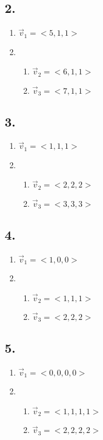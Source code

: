 \documentclass{article}
\begin{document}
\subsection{2.}
\begin{enumerate}[label=\textbf{\alph*.}]
	\item $ \vec{v}_1 = <5, 1, 1> $
	\item
		\begin{enumerate}[label=\textbf{\arabic*.}]
			\item $ \vec{v}_2 = <6, 1, 1> $
			\item $ \vec{v}_3 = <7, 1, 1> $
		\end{enumerate}
\end{enumerate}

\subsection{3.}
\begin{enumerate}[label=\textbf{\alph*.}]
	\item $ \vec{v}_1 = <1, 1, 1> $
	\item
		\begin{enumerate}[label=\textbf{\arabic*.}]
			\item $ \vec{v}_2 = <2, 2, 2> $
			\item $ \vec{v}_3 = <3, 3, 3> $
		\end{enumerate}
\end{enumerate}

\subsection{4.}
\begin{enumerate}[label=\textbf{\alph*.}]
	\item $ \vec{v}_1 = <1, 0, 0> $
	\item
		\begin{enumerate}[label=\textbf{\arabic*.}]
			\item $ \vec{v}_2 = <1, 1, 1> $
			\item $ \vec{v}_3 = <2, 2, 2> $
		\end{enumerate}
\end{enumerate}

\subsection{5.}
\begin{enumerate}[label=\textbf{\alph*.}]
	\item $ \vec{v}_1 = <0, 0, 0, 0> $
	\item
		\begin{enumerate}[label=\textbf{\arabic*.}]
			\item $ \vec{v}_2 = <1, 1, 1, 1> $
			\item $ \vec{v}_3 = <2, 2, 2, 2> $
		\end{enumerate}
\end{enumerate}
\end{document}
